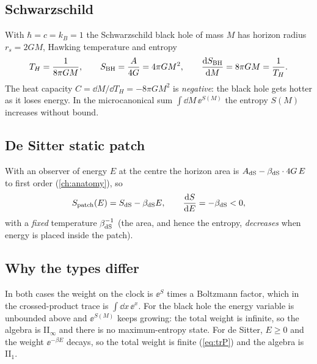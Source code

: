 \subsection{Schwarzschild}
\mshift{10mm}
With $\hbar=c=k_B=1$ the Schwarzschild black hole of mass $M$ has horizon radius $r_s=2GM$, Hawking temperature and entropy
\begin{equation}
T_H=\frac1{8\pi GM},\qquad S_{\rm BH}=\frac{A}{4G}=4\pi GM^2,\qquad\frac{\mathrm{d} S_{\rm BH}}{\mathrm{d} M}=8\pi GM=\frac1{T_H}.
\end{equation}
The heat capacity $C=\dd M/\dd T_H=-8\pi GM^2$ is \emph{negative}: the black hole gets hotter as it loses energy. In the microcanonical sum $\int\dd M\,\ee^{S(M)}$ the entropy $S(M)$ increases without bound.

\subsection{De Sitter static patch}
With an observer of energy $E$ at the centre the horizon area is $A_{\rm dS}-\beta_{\rm dS}\cdot4G\,E$ to first order (\cref{ch:anatomy}), so
\begin{equation}
S_{\rm patch}(E)=S_{\rm dS}-\beta_{\rm dS}E,\qquad\frac{\mathrm{d} S}{\mathrm{d} E}=-\beta_{\rm dS}<0,
\end{equation}
with a \emph{fixed} temperature $\beta_{\rm dS}^{-1}$ (the area, and hence the entropy, \emph{decreases} when energy is placed inside the patch).

\subsection{Why the types differ}
In both cases the weight on the clock is $\ee^{S}$ times a Boltzmann factor, which in the crossed-product trace is $\int\dd x\,\ee^{x}$. For the black hole the energy variable is unbounded above and $\ee^{S(M)}$ keeps growing: the total weight is infinite, so the algebra is II$_\infty$ and there is no maximum-entropy state. For de Sitter, $E\ge0$ and the weight $\ee^{-\beta E}$ decays, so the total weight is finite (\eqref{eq:trP}) and the algebra is II$_1$.

